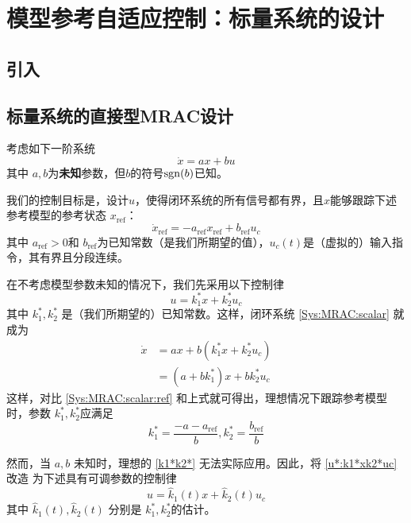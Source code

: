 \section{模型参考自适应控制：标量系统的设计}\label{4Bref}

\subsection{引入}

\subsection{标量系统的直接型MRAC设计}
考虑如下一阶系统
\begin{equation}
  \dot{x} = a  x + b  u \label{Sys:MRAC:scalar}
\end{equation}
其中 $a, b$为{\bf 未知}参数，但$b$的符号$\operatorname{sgn}(b)$已知。

我们的控制目标是，设计$u$，使得闭环系统的所有信号都有界，且$x$能够跟踪下述参考模型的参考状态 $x_{\ensuremath{\operatorname{ref}}}$：
\begin{equation}
  \dot{x}_{\ensuremath{\operatorname{ref}}} = -
  a_{\ensuremath{\operatorname{ref}}} x_{\ensuremath{\operatorname{ref}}} +
  b_{\ensuremath{\operatorname{ref}}} u_c \label{Sys:MRAC:scalar:ref}
\end{equation}
其中 $a_{\ensuremath{\operatorname{ref}}} > 0$和
$b_{\ensuremath{\operatorname{ref}}}$为已知常数（是我们所期望的值），$u_c
(t)$是（虚拟的）输入指令，其有界且分段连续。

在不考虑模型参数未知的情况下，我们先采用以下控制律
\begin{equation}
  u = k^{\ast}_1 x + k^{\ast}_2 u_c \label{u*:k1*xk2*uc}
\end{equation}
其中 $k^{\ast}_1, k^{\ast}_2$ 是（我们所期望的）已知常数。这样，闭环系统 \eqref{Sys:MRAC:scalar} 就成为
\begin{align*}
  \dot{x} & = a  x + b  (k^{\ast}_1 x + k^{\ast}_2 u_c)\\
  & = (a + b  k^{\ast}_1)  x + b  k^{\ast}_2 u_c
\end{align*}
这样，对比 \eqref{Sys:MRAC:scalar:ref} 和上式就可得出，理想情况下跟踪参考模型时，参数
$k^{\ast}_1, k^{\ast}_2$应满足
\begin{equation}
  k^{\ast}_1 = \frac{-a - a_{\ensuremath{\operatorname{ref}}}}{b}, k^{\ast}_2 =
  \frac{b_{\ensuremath{\operatorname{ref}}}}{b} \label{k1*k2*}
\end{equation}

然而，当 $a, b$ 未知时，理想的 \eqref{k1*k2*} 无法实际应用。因此，将 \eqref{u*:k1*xk2*uc} 改造
为下述具有可调参数的控制律
\begin{equation}
  u = \hat{k}_1 (t) x + \hat{k}_2 (t) u_c \label{u:k1xk2uc}
\end{equation}
其中 $\hat{k}_1 (t), \hat{k}_2 (t)$ 分别是 $k^{\ast}_1,k^{\ast}_2$的估计。

